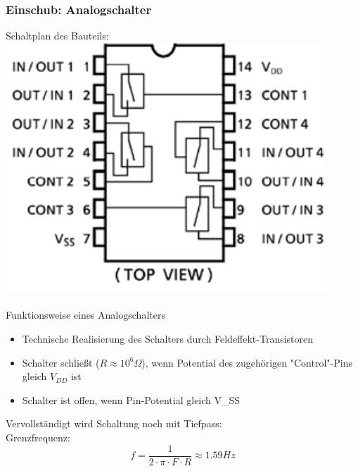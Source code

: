 \documentclass[compress,11pt]{beamer}
\begin{document}
\subsubsection{Einschub: Analogschalter}
\begin{frame}
Schaltplan des Bauteils:\\
\includegraphics[width=.7\textwidth]{schalt/analog}
\end{frame}
\begin{frame}
\begin{block}{Funktionsweise eines Analogschalters}
\begin{itemize}
\item Technische Realisierung des Schalters durch Feldeffekt-Transistoren
\item Schalter schließt ($R \approx 10^6 \Omega$), wenn Potential des zugehörigen "Control"-Pins gleich $V_{DD}$ ist
\item Schalter ist offen, wenn Pin-Potential gleich V_{SS}
\end{itemize}
\end{block}
\end{frame}
\begin{frame}
Vervollständigt wird Schaltung noch mit Tiefpass:\\
Grenzfrequenz:
\begin{equation}
f = \frac{1}{2 \cdot \pi \cdot F \cdot R} \approx 1.59 Hz
\end{equation}
\end{frame}
\end{document}
